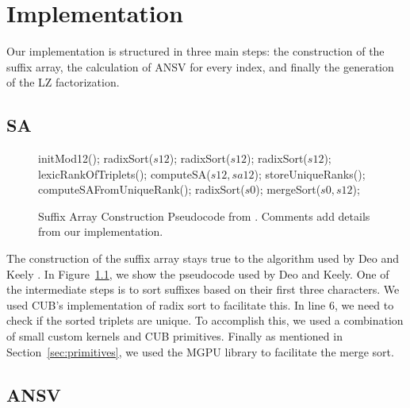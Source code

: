 \chapter{Implementation}
\label{chap:implementation}

Our implementation is structured in three main steps: the construction of the suffix array, the calculation of ANSV for every index, and finally the generation of the LZ factorization.

\section{SA}
\label{sec:sa}

\begin{figure}[h]
\begin{algorithmic}[1]
\State initMod12();
\State radixSort($s12$);
\State radixSort($s12$); 
\State radixSort($s12$); 
\State lexicRankOfTriplets();
\State computeSA($s12,sa12$);
\State storeUniqueRanks();
\Else
\State computeSAFromUniqueRank();
\EndIf
\State radixSort($s0$); 
\State mergeSort($s0,s12$); 
\EndProcedure
\end{algorithmic}
\caption{Suffix Array Construction Pseudocode from \cite{Deo}. Comments add details from our implementation.}
\label{algorithm:sa}
\end{figure}


The construction of the suffix array stays true to the algorithm used by Deo and Keely \cite{Deo}.
In Figure~\ref{algorithm:sa}, we show the pseudocode used by Deo and Keely.
One of the intermediate steps is to sort suffixes based on their first three characters.
We used CUB's implementation of radix sort to facilitate this.
In line 6, we need to check if the sorted triplets are unique.
To accomplish this, we used a combination of small custom kernels and CUB primitives.
Finally as mentioned in Section~\ref{sec:primitives}, we used the MGPU library to facilitate the merge sort.

\section{ANSV}


